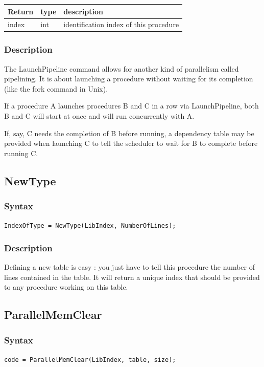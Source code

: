 \documentclass[a4paper,12pt]{article}
\begin{document}
\medskip

\noindent
\begin{tabular}{|m{3cm}|m{1.5cm}|m{10.5cm}|}
\hline
Return       & type   & description \\
\hline
index        & int    & identification index of this procedure \\
\hline
\end{tabular}

\subsubsection*{Description}
The LaunchPipeline command allows for another kind of parallelism called pipelining. It is about launching a procedure without waiting for its completion (like the fork command in Unix).

If a procedure A launches procedures B and C in a row via LaunchPipeline, both B and C will start at once and will run concurrently with A.

If, say, C needs the completion of B before running, a dependency table may be provided when launching C to tell the scheduler to wait for B to complete before running C.


\subsection{NewType}

\subsubsection*{Syntax}
\tt{IndexOfType = NewType(LibIndex, NumberOfLines);}
\normalfont

\subsubsection*{Description}
Defining a new table is easy : you just have to tell this procedure the number of lines contained in the table. It will return a unique index that should be provided to any procedure working on this table.


\subsection{ParallelMemClear}

\subsubsection*{Syntax}
\tt{code = ParallelMemClear(LibIndex, table, size);}
\normalfont
\end{document}
